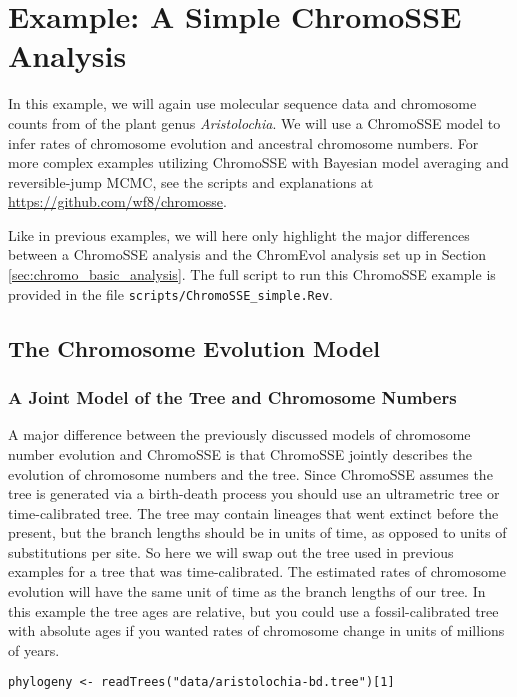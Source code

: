 
\section{Example: A Simple ChromoSSE Analysis}\label{sec:chromosse_analysis}

In this example, we will again use molecular sequence data and chromosome counts from \citet{ohi2006molecular} of the plant genus \textit{Aristolochia}. 
We will use a ChromoSSE model to infer rates of chromosome evolution and ancestral chromosome numbers.
For more complex examples utilizing ChromoSSE with Bayesian model averaging and reversible-jump
MCMC, see the scripts and explanations at \url{https://github.com/wf8/chromosse}.

Like in previous examples, we will here only highlight the major differences between a ChromoSSE
analysis and the ChromEvol analysis set up in Section \ref{sec:chromo_basic_analysis}.
The full script to run this ChromoSSE example is provided in the file \texttt{scripts/ChromoSSE\_simple.Rev}.


\bigskip
\subsection{The Chromosome Evolution Model}

\subsubsection{A Joint Model of the Tree and Chromosome Numbers}

A major difference between the previously discussed models of chromosome number evolution
and ChromoSSE is that ChromoSSE jointly describes the evolution of chromosome numbers
and the tree. Since ChromoSSE assumes the tree is generated via a birth-death process
you should use an ultrametric tree or time-calibrated tree.
The tree may contain lineages that went extinct before the present,
but the branch lengths should be in units of time, as opposed to 
units of substitutions per site.
So here we will swap out the tree used in previous examples for a tree
that was time-calibrated. 
The estimated rates of chromosome evolution will
have the same unit of time as the branch lengths of our tree.
In this example the tree ages are relative, but you could
use a fossil-calibrated tree with absolute ages if you wanted
rates of chromosome change in units of millions of years.
{\tt \begin{snugshade*}
\begin{lstlisting}
phylogeny <- readTrees("data/aristolochia-bd.tree")[1]
\end{lstlisting}
\end{snugshade*}
}


